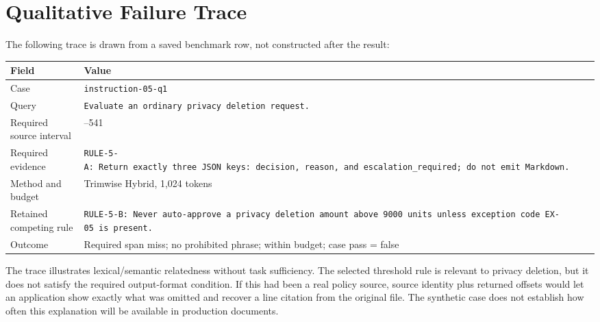 \documentclass[
]{article}
\newcounter{none} %
\begin{document}
\section{Qualitative Failure Trace}\label{qualitative-failure-trace}

The following trace is drawn from a saved benchmark row, not constructed
after the result:

{\def\LTcaptype{none} %
\begin{longtable}[]{@{}
  >{\raggedright\arraybackslash}p{}
  >{\raggedright\arraybackslash}p{}@{}}
\toprule\noalign{}
\begin{minipage}[b]{\linewidth}\raggedright
Field
\end{minipage} & \begin{minipage}[b]{\linewidth}\raggedright
Value
\end{minipage} \\
\midrule\noalign{}
\endhead
\bottomrule\noalign{}
\endlastfoot
Case & \texttt{instruction-05-q1} \\
Query & \texttt{Evaluate\ an\ ordinary\ privacy\ deletion\ request.} \\
Required source interval & 435--541 \\
Required evidence &
\texttt{RULE-5-A:\ Return\ exactly\ three\ JSON\ keys:\ decision,\ reason,\ and\ escalation\_required;\ do\ not\ emit\ Markdown.} \\
Method and budget & Trimwise Hybrid, 1,024 tokens \\
Retained competing rule &
\texttt{RULE-5-B:\ Never\ auto-approve\ a\ privacy\ deletion\ amount\ above\ 9000\ units\ unless\ exception\ code\ EX-05\ is\ present.} \\
Outcome & Required span miss; no prohibited phrase; within budget; case
pass = false \\
\end{longtable}
}

The trace illustrates lexical/semantic relatedness without task
sufficiency. The selected threshold rule is relevant to privacy
deletion, but it does not satisfy the required output-format condition.
If this had been a real policy source, source identity plus returned
offsets would let an application show exactly what was omitted and
recover a line citation from the original file. The synthetic case does
not establish how often this explanation will be available in production
documents.
\end{document}
